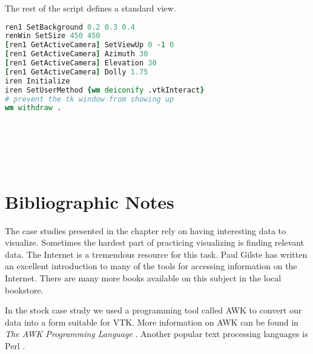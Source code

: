 The rest of the script defines a standard view.

\begin{lstlisting}[language=TCL, caption={Create the view.}]
ren1 SetBackground 0.2 0.3 0.4
renWin SetSize 450 450
[ren1 GetActiveCamera] SetViewUp 0 -1 0
[ren1 GetActiveCamera] Azimuth 30
[ren1 GetActiveCamera] Elevation 30
[ren1 GetActiveCamera] Dolly 1.75
iren Initialize
iren SetUserMethod {wm deiconify .vtkInteract}
# prevent the tk window from showing up
wm withdraw .
\end{lstlisting}

\subsection{}

\begin{lstlisting}[language=TCL, caption={.}]
\end{lstlisting}

\subsection{}

\begin{lstlisting}[language=TCL, caption={.}]
\end{lstlisting}

\subsection{}

\begin{lstlisting}[language=TCL, caption={.}]
\end{lstlisting}


\section{Bibliographic Notes}

The case studies presented in the chapter rely on having interesting data to visualize. Sometimes the hardest part of practicing visualizing is finding relevant data. The Internet is a tremendous resource for this task. Paul Gilste \cite{Gilster94} has written an excellent introduction to many of the tools for accessing information on the Internet. There are many more books available on this subject in the local bookstore.

In the stock case study we used a programming tool called AWK to convert our data into a form suitable for VTK. More information on AWK can be found in \emph{The AWK Programming Language} \cite{Aho88}. Another popular text processing languages is Perl \cite{Perl95}.

